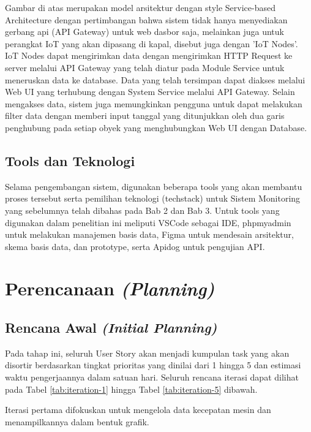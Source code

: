 Gambar di atas merupakan model arsitektur dengan style Service-based Architecture dengan pertimbangan bahwa sistem tidak hanya menyediakan gerbang api (API Gateway) untuk web dasbor saja, melainkan juga untuk perangkat IoT yang akan dipasang di kapal, disebut juga dengan 'IoT Nodes'. IoT Nodes dapat mengirimkan data dengan mengirimkan HTTP Request ke server melalui API Gateway yang telah diatur pada Module Service untuk meneruskan data ke database. Data yang telah tersimpan dapat diakses melalui Web UI yang terhubung dengan System Service melalui API Gateway. Selain mengakses data, sistem juga memungkinkan pengguna untuk dapat melakukan filter data dengan memberi input tanggal yang ditunjukkan oleh dua garis penghubung pada setiap obyek yang menghubungkan Web UI dengan Database.

\subsection{Tools dan Teknologi}

Selama pengembangan sistem, digunakan beberapa tools yang akan membantu proses tersebut serta pemilihan teknologi (techstack) untuk Sistem Monitoring yang sebelumnya telah dibahas pada Bab 2 dan Bab 3. Untuk tools yang digunakan dalam penelitian ini meliputi VSCode sebagai IDE, phpmyadmin untuk melakukan manajemen basis data, Figma untuk mendesain arsitektur, skema basis data, dan prototype, serta Apidog untuk pengujian API.

\section{Perencanaan \textit{(Planning)}}

\subsection{Rencana Awal \textit{(Initial Planning)}}

Pada tahap ini, seluruh User Story akan menjadi kumpulan task yang akan disortir berdasarkan tingkat prioritas yang dinilai dari 1 hingga 5 dan estimasi waktu pengerjaannya dalam satuan hari. Seluruh rencana iterasi dapat dilihat pada Tabel \ref{tab:iteration-1} hingga Tabel \ref{tab:iteration-5} dibawah.

Iterasi pertama difokuskan untuk mengelola data kecepatan mesin dan menampilkannya dalam bentuk grafik.



